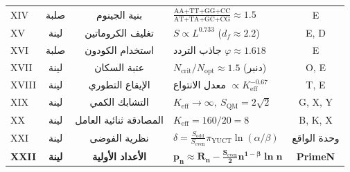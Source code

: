\documentclass[12pt,a4paper]{article}
\begin{document}
\begin{otherlanguage}{english}
\begin{table}[htbp]
\begin{tabular}{l c c p{3.2cm} c}
				XIV & صلبة & بنية الجينوم & \(\frac{\text{AA+TT+GG+CC}}{\text{AT+TA+GC+CG}} \approx 1.5\) & E \\
				XV  & لينة & تغليف الكروماتين & \(S \propto L^{0.733}\) (\(d_f \approx 2.2\)) & E, D \\
				XVI & صلبة & استخدام الكودون & جاذب التردد \(\varphi \approx 1.618\) & E \\
				XVII& لينة & عتبة السكان & \(N_{\mathrm{crit}}/N_{\mathrm{opt}} \approx 1.5\) (دنبر) & O, E \\
				XVIII&لينة & الإيقاع التطوري & معدل الانتواع \(\propto K_{\mathrm{eff}}^{-0.67}\) & T, E \\
				XIX & لينة & التشابك الكمي & \(K_{\mathrm{eff}} \to \infty,\ S_{\mathrm{QM}} = 2\sqrt{2}\) & G, X, Y \\
				XX  & لينة & المصادقة ثنائية العامل & \(K_{\mathrm{eff}} = 160/20 = 8\) & B, K, X \\
				XXI & لينة & نظرية الفوضى & \(\delta = \frac{S_{\mathrm{odd}}}{S_{\mathrm{even}}} \pi_{\mathrm{YUCT}} \ln(\alpha/\beta)\) & وحدة الواقع \\
				\textbf{XXII} & \textbf{لينة} & \textbf{الأعداد الأولية} & \(\mathbf{p_n \approx R_n - \frac{S_{\mathrm{even}}}{2}n^{1-\beta}\ln n}\) & \textbf{PrimeN} \\
				\bottomrule
			\end{tabular}
		\end{table}
	\end{otherlanguage}
	
\end{document}
